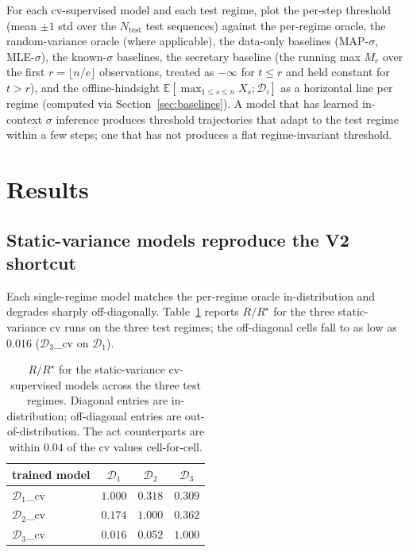 \documentclass[11pt]{article}
\begin{document}
For each cv-supervised model and each test regime, plot the per-step threshold (mean $\pm 1$ std over the $N_{\mathrm{test}}$ test sequences) against the per-regime oracle, the random-variance oracle (where applicable), the data-only baselines (MAP-$\sigma$, MLE-$\sigma$), the known-$\sigma$ baselines, the secretary baseline (the running max $M_r$ over the first $r = \lfloor n/e \rfloor$ observations, treated as $-\infty$ for $t \le r$ and held constant for $t > r$), and the offline-hindsight $\mathbb{E}[\max_{1 \le s \le n} X_s; \mathcal{D}_i]$ as a horizontal line per regime (computed via Section~\ref{sec:baselines}). A model that has learned in-context $\sigma$ inference produces threshold trajectories that adapt to the test regime within a few steps; one that has not produces a flat regime-invariant threshold.

\section{Results}
\label{sec:results}

\subsection{Static-variance models reproduce the V2 shortcut}
\label{sec:res-static-shortcut}

Each single-regime model matches the per-regime oracle in-distribution and degrades sharply off-diagonally. Table~\ref{tab:res-static} reports $R/R^\star$ for the three static-variance cv runs on the three test regimes; the off-diagonal cells fall to as low as $0.016$ ($\mathcal{D}_3$\_cv on $\mathcal{D}_1$).

\begin{table}[H]
\centering
\small
\begin{tabular}{lccc}
\hline
trained model & $\mathcal{D}_1$ & $\mathcal{D}_2$ & $\mathcal{D}_3$ \\
\hline
$\mathcal{D}_1$\_cv & $1.000$ & $0.318$ & $0.309$ \\
$\mathcal{D}_2$\_cv & $0.174$ & $1.000$ & $0.362$ \\
$\mathcal{D}_3$\_cv & $0.016$ & $0.052$ & $1.000$ \\
\hline
\end{tabular}
\caption{$R/R^\star$ for the static-variance cv-supervised models across the three test regimes. Diagonal entries are in-distribution; off-diagonal entries are out-of-distribution. The act counterparts are within $0.04$ of the cv values cell-for-cell.}
\label{tab:res-static}
\end{table}
\end{document}
